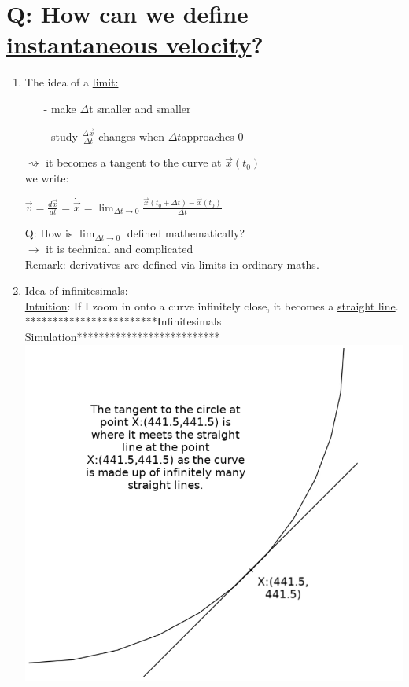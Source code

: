 \documentclass[a4paper, 12pt]{article}
\begin{document}
\section{Q: How can we define \underline{instantaneous velocity}?}
\begin{enumerate}
\item The idea of a \underline{limit:}
\begin{itemize}
\item[-] make $\Delta$t smaller and smaller
\item[-] study $\frac{\Delta\vec{x}}{\Delta t}$ changes when $\Delta t$approaches 0   \end{itemize}
$\rightsquigarrow$ it becomes a tangent to the curve at $\vec{x}(t_0)$\\
we write:
\begin{center}
$\vec{v} = \frac{d \vec{x}}{dt} = \dot{\vec{x}} = \displaystyle\lim_{\Delta t\to 0} \frac{\vec{x}(t_0+\Delta t) - \vec{x}(t_0)}{\Delta t}$\\
\end{center}
Q: How is $\displaystyle\lim_{\Delta t \to 0}$ defined mathematically?\\
$\rightarrow$ it is technical and complicated\\
\underline{Remark:} derivatives are defined via limits in ordinary maths.
\item Idea of \underline{infinitesimals:}\\
\underline{Intuition}: If I zoom in onto a curve infinitely close, it becomes a \underline{straight line}.\\
************************Infinitesimals Simulation**************************\\
\includegraphics[scale=0.65]{Infinitesimals Simulation}\\

\end{enumerate}
\end{document}
